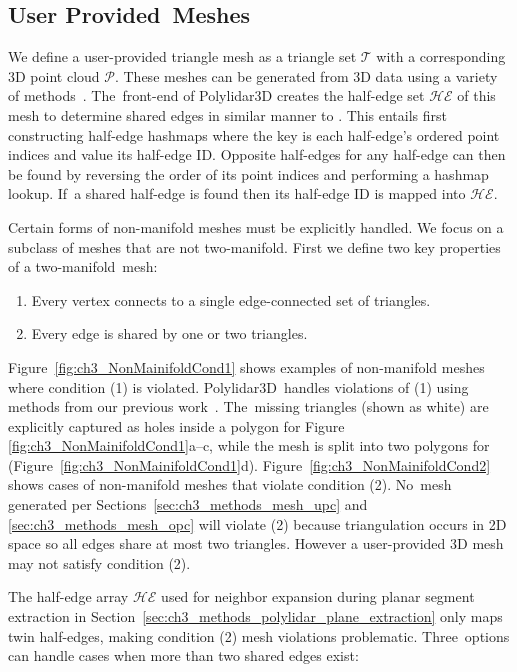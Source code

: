\subsection{User Provided~Meshes}\label{sec:ch3_methods_mesh_user}

We define a user-provided triangle mesh as a triangle set $\mathcal{T}$ with a corresponding 3D point cloud $\mathcal{P}$. These meshes can be generated from 3D data using a variety of methods~\cite{kazhdan_screened_2013,bernardini_ball-pivoting_1999,zhou_dense_2013}. The~front-end of Polylidar3D  creates the half-edge set $\mathcal{HE}$ of this mesh to determine shared edges in similar manner to \cite{zhou_open3d_2018}. This entails first constructing half-edge hashmaps where the key is each half-edge's ordered point indices and value its half-edge ID. Opposite half-edges for any half-edge can then be found by reversing the order of its point indices and performing a hashmap lookup. If~a shared half-edge is found then its half-edge ID is mapped into $\mathcal{HE}$.

Certain forms of non-manifold meshes must be explicitly handled. We focus on a subclass of meshes that are not two-manifold. First we define two key properties of a two-manifold~mesh: 
\begin{enumerate}
    \item Every vertex connects to a single edge-connected set of triangles.
    \item Every edge is shared by one or two triangles.
\end{enumerate}

Figure~\ref{fig:ch3_NonMainifoldCond1} shows examples of non-manifold meshes where condition (1) is violated. Polylidar3D~handles violations of (1)  using methods from our previous work~\cite{castagno_polylidar_2020}. The~missing triangles (shown as white) are explicitly captured as holes inside a polygon for Figure {\ref{fig:ch3_NonMainifoldCond1}}a--c, while the mesh is split into two polygons for (Figure~\ref{fig:ch3_NonMainifoldCond1}d). Figure~\ref{fig:ch3_NonMainifoldCond2} shows cases of non-manifold meshes that violate condition (2). No~mesh generated per Sections~\ref{sec:ch3_methods_mesh_upc} and \ref{sec:ch3_methods_mesh_opc} will violate (2)  because triangulation occurs in 2D space so all edges share at most two triangles. However a user-provided 3D mesh may not satisfy condition (2).


The half-edge array $\mathcal{HE}$ used for neighbor expansion during planar segment extraction in Section~\ref{sec:ch3_methods_polylidar_plane_extraction} only maps twin half-edges, making condition (2) mesh violations problematic. Three~options can handle cases when more than two shared edges exist:

